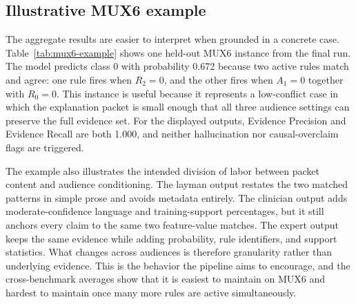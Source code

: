 \documentclass[sigconf,nonacm]{acmart}
\begin{document}
\subsection{Illustrative MUX6 example}
The aggregate results are easier to interpret when grounded in a concrete case. Table~\ref{tab:mux6-example} shows one held-out MUX6 instance from the final run. The model predicts class 0 with probability 0.672 because two active rules match and agree: one rule fires when $R_2 = 0$, and the other fires when $A_1 = 0$ together with $R_0 = 0$. This instance is useful because it represents a low-conflict case in which the explanation packet is small enough that all three audience settings can preserve the full evidence set. For the displayed outputs, Evidence Precision and Evidence Recall are both 1.000, and neither hallucination nor causal-overclaim flags are triggered.

The example also illustrates the intended division of labor between packet content and audience conditioning. The layman output restates the two matched patterns in simple prose and avoids metadata entirely. The clinician output adds moderate-confidence language and training-support percentages, but it still anchors every claim to the same two feature-value matches. The expert output keeps the same evidence while adding probability, rule identifiers, and support statistics. What changes across audiences is therefore granularity rather than underlying evidence. This is the behavior the pipeline aims to encourage, and the cross-benchmark averages show that it is easiest to maintain on MUX6 and hardest to maintain once many more rules are active simultaneously.
\end{document}
